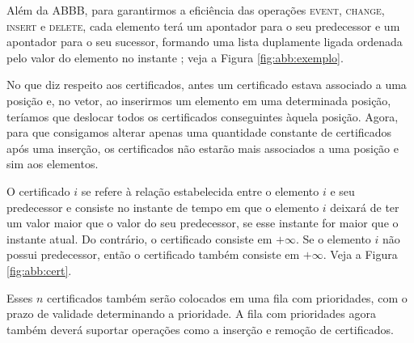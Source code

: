 Além da ABBB, para garantirmos a eficiência das operações
\textsc{event}, \textsc{change}, \textsc{insert} e \textsc{delete},
cada elemento terá um apontador para o seu predecessor e um
apontador para o seu sucessor, formando uma lista duplamente ligada
ordenada pelo valor do elemento no instante \now; veja a Figura
\ref{fig:abb:exemplo}.



No que diz respeito aos certificados, antes um certificado estava
associado a uma posição e, no vetor, ao inserirmos um elemento em
uma determinada posição, teríamos que deslocar %
todos os certificados conseguintes àquela posição. Agora, para que
consigamos alterar apenas uma quantidade constante de certificados
após uma inserção, os certificados não estarão mais associados a uma
posição e sim aos elementos.

O certificado $i$ se refere à relação estabelecida entre o elemento
$i$ e seu predecessor e consiste no instante de tempo em que o
elemento $i$ deixará de ter um valor maior que o valor do seu
predecessor, se esse instante for maior que o instante atual. Do
contrário, o certificado consiste em $+\infty$. Se o elemento $i$
não possui predecessor, então o certificado também consiste em
$+\infty$. Veja a Figura \ref{fig:abb:cert}.

Esses $n$ certificados também serão colocados em uma fila com
prioridades, com o prazo de validade determinando a prioridade.
A fila com prioridades agora também deverá suportar operações
como a inserção e remoção de certificados.



